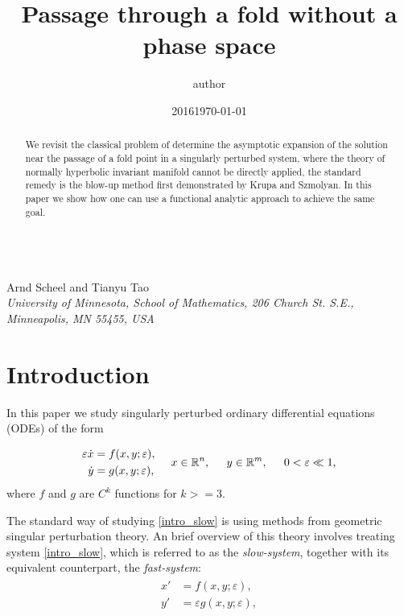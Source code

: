 \documentclass[letterpaper,11pt]{article}
\title{Passage through a fold without a phase space}
\author{author}
\date{2016}
\newcommand{\eps}{\varepsilon}
\numberwithin{equation}{section}
\theoremstyle{plain}
\begin{document}
\begin{center}

{\fontsize{17}{17}\selectfont{Alternatives to the blow-up method in singular perturbation problems}}\\[0.2in]
Arnd Scheel and Tianyu Tao\\
\textit{\footnotesize 
University of Minnesota, School of Mathematics,   206 Church St. S.E., Minneapolis, MN 55455, USA}
\date{\small \today} 
\vspace*{0.2in}
\end{center}

\begin{abstract}
\noindent We revisit the classical problem of determine the asymptotic expansion of the solution near the passage of a fold point in a singularly perturbed system, where the theory of normally hyperbolic invariant manifold cannot be directly applied, the standard remedy is the blow-up method first demonstrated by Krupa and Szmolyan. In this paper we show how one can use a functional analytic approach to achieve the same goal.
\end{abstract}

\section{Introduction}
In this paper we study singularly perturbed ordinary differential equations (ODEs) of the form

\begin{align}\label{intro_slow}
\begin{split}
\eps \dot{x} &=  f(x,y;\eps),\\
\dot{y } &=   g(x,y;\eps),   
\end{split}\hspace{0.2in} x\in \mathbb{R}^n, \hspace{0.2in} y \in \mathbb{R}^m, \hspace{0.2in} 0<\eps \ll 1,
\end{align}
where $f$ and $g$ are $C^k$ functions for $k>=3$.

The standard way of studying \eqref{intro_slow} is using methods from geometric singular perturbation theory. An brief overview of this theory involves treating system \eqref{intro_slow}, which is referred to as the \textit{slow-system}, together with its  equivalent counterpart, the \textit{fast-system}:
\begin{align}\label{intro_fast}
\begin{split}
x' &=  f(x,y;\eps),\\
y' &=  \eps g(x,y;\eps),   
\end{split}
\end{align}
\end{document}

